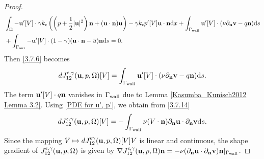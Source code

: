 \documentclass[oneside,11pt]{book}
\numberwithin{equation}{section}
\begin{document}
\begin{proof}
    \begin{align}
        &\int_\Omega -{\bf u}'[V]\cdot\gamma k_\epsilon\left(\left(p + \frac{1}{2}|{\bf u}|^2\right){\bf n} + ({\bf u}\cdot{\bf n}){\bf u}\right) - \gamma k_\epsilon p'[V]{\bf u}\cdot{\bf n}{\rm d}x + \int_{\Gamma_{\rm wall}} {\bf u}'[V]\cdot(\nu\partial_{\bf n}{\bf v} - q{\bf n}){\rm d}s\\
        &+ \int_{\Gamma_{\rm out}} -{\bf u}'[V]\cdot(1 - \gamma)({\bf u}\cdot{\bf n} - \overline{u}){\bf n}{\rm d}s = 0.
    \end{align}
    Then \eqref{3.7.6} becomes
    \begin{align}
        \label{3.7.14}
        dJ_{12}^{\epsilon,\gamma}({\bf u},p,\Omega)[V] = \int_{\Gamma_{\rm wall}} {\bf u}'[V]\cdot(\nu\partial_{\bf n}{\bf v} - q{\bf n}){\rm d}s.
    \end{align}
    The term ${\bf u}'[V]\cdot q{\bf n}$ vanishes in $\Gamma_{\rm wall}$ due to Lemma \ref{Kasumba_Kunisch2012 Lemma 3.2}. Using \eqref{PDE for u', p'}, we obtain from \eqref{3.7.14}
    \begin{align}
        dJ_{12}^{\epsilon,\gamma}({\bf u},p,\Omega)[V] = -\int_{\Gamma_{\rm wall}} \nu(V\cdot{\bf n})\partial_{\bf n}{\bf u}\cdot\partial_{\bf n}{\bf v}{\rm d}s.
    \end{align}
    Since the mapping $V\mapsto dJ_{12}^{\epsilon\gamma}({\bf u},p,\Omega)[V]V$ is linear and continuous, the shape gradient of $J_{12}^{\epsilon,\gamma}({\bf u},p,\Omega)$ is given by $\nabla J_{12}^{\epsilon,\gamma}({\bf u},p,\Omega){\bf n} = -\nu(\partial_{\bf n}{\bf u}\cdot\partial_{\bf n}{\bf v}){\bf n}|_{\Gamma_{\rm wall}}$.
    

\end{proof}
\end{document}
